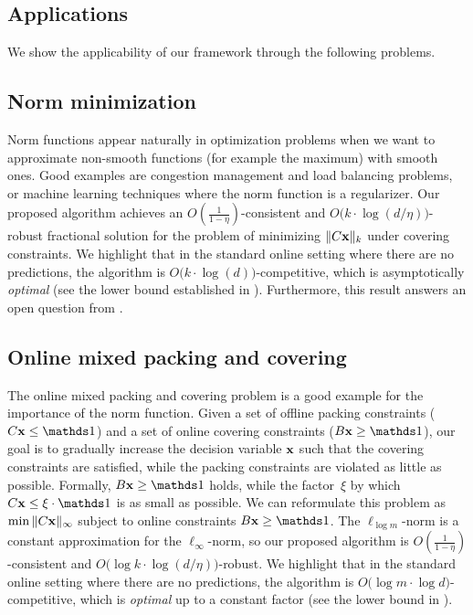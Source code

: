 \subsection{Applications}
We show the applicability of our framework through the following problems.

\subsection{Norm minimization}

Norm functions appear naturally in optimization problems when we want to approximate non-smooth functions (for example the maximum) with smooth ones. Good examples are congestion management and load balancing problems, or machine learning techniques where the norm function is a regularizer. Our proposed algorithm achieves an $O(\frac{1}{1 - \eta})$-consistent and $O\bigl( k \cdot \log (d/\eta)\bigr)$-robust fractional solution for the problem of minimizing $\|C \mathbf{x}\|_{k}$ under covering constraints. We highlight that in the standard online setting where there are no predictions, the algorithm is  $O\bigl( k \cdot \log (d)\bigr)$-competitive, which is asymptotically \emph{optimal} (see the lower bound established in \cite{AzarCohen14:Online-Covering}). Furthermore, this result answers an open question from \cite{NagarajanShen17:Online-Covering}.

\subsection{Online mixed packing and covering}

The online mixed packing and covering problem is a good example for the importance of the norm function. Given a set of offline packing constraints ($C \vect{x} \leq \one$) and a set of online covering constraints ($B \vect{x} \geq \one$), our goal is to gradually increase the decision variable $\mathbf{x}$ such that the covering constraints are satisfied, while the packing constraints are violated as little as possible. Formally, $B \vect{x} \geq \one$ holds, while the factor~$\xi$ by which $C \vect{x} \leq \xi \cdot \one$ is as small as possible. We can reformulate this problem as $\min \| C \mathbf{x}\|_{\infty}$ subject to online constraints $B \vect{x} \geq \one$. The $\ell_{\log m}$-norm is a constant approximation for the $\ell_{\infty}$-norm, so our proposed algorithm is $O(\frac{1}{1 - \eta})$-consistent and $O\bigl( \log k \cdot \log (d/\eta)\bigr)$-robust. We highlight that in the standard online setting where there are no predictions, the algorithm is $O\bigl( \log m \cdot \log d \bigr)$-competitive, which is \emph{optimal} up to a constant factor (see the lower bound in \cite{AzarBhaskar13:Online-mixed}).

